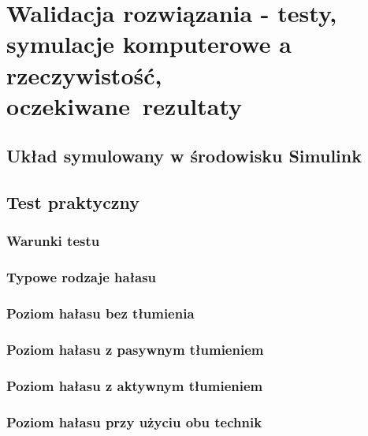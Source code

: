 \chapter{Walidacja rozwiązania - testy, symulacje komputerowe a rzeczywistość, oczekiwane~rezultaty}
\label{cha:tests}

\section{Układ symulowany w środowisku Simulink}

\section{Test praktyczny}

\subsection{Warunki testu}
\subsection{Typowe rodzaje hałasu}
\subsection{Poziom hałasu bez tłumienia}
\subsection{Poziom hałasu z pasywnym tłumieniem}
\subsection{Poziom hałasu z aktywnym tłumieniem}
\subsection{Poziom hałasu przy użyciu obu technik}